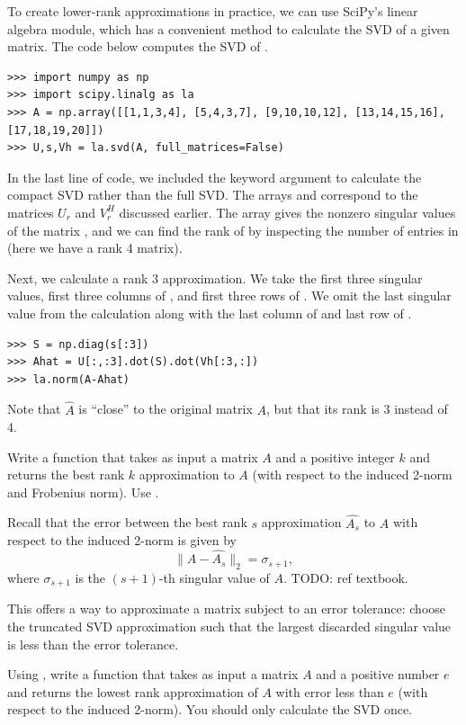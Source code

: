 To create lower-rank approximations in practice, we can use SciPy's linear algebra module, which has a convenient method to calculate the SVD of a given matrix. 
The code below computes the SVD of .
\begin{lstlisting}
>>> import numpy as np
>>> import scipy.linalg as la
>>> A = np.array([[1,1,3,4], [5,4,3,7], [9,10,10,12], [13,14,15,16], [17,18,19,20]])
>>> U,s,Vh = la.svd(A, full_matrices=False)
\end{lstlisting}
In the last line of code, we included the keyword argument  to calculate the
compact SVD rather than the full SVD. The arrays  and  correspond to the matrices
$U_r$ and $V_r^H$ discussed earlier. The array  gives the nonzero singular values
of the matrix , and we can find the rank of  by inspecting the number of entries in  (here we have a rank 4 matrix). 

Next, we calculate a rank 3 approximation.
We take the first three singular values, first three columns of , and first three rows of .
We omit the last singular value from the calculation along with the last column of  and last row of .

\begin{lstlisting}
>>> S = np.diag(s[:3])
>>> Ahat = U[:,:3].dot(S).dot(Vh[:3,:])
>>> la.norm(A-Ahat)
\end{lstlisting}
Note that $\widehat A$ is ``close'' to the original matrix $A$, but that its rank is 3 instead of 4. 

\begin{problem}
Write a function  that takes as input a matrix $A$ and a positive integer $k$ and returns 
the best rank $k$ approximation to $A$ (with respect to the induced 2-norm and Frobenius norm).
Use .
\label{prob:svd_approx}
\end{problem}

Recall that the error between the best rank $s$ approximation $\widehat{A_s}$ to $A$ with respect to the induced 
2-norm is given by
$$
\|A - \widehat{A_s}\|_2 = \sigma_{s+1},
$$
where $\sigma_{s+1}$ is the $(s+1)$-th singular value of $A$. 
TODO: ref textbook.

This offers a way to approximate a matrix subject to an error tolerance: 
choose the truncated SVD approximation such that the largest discarded singular value is less than the error tolerance.

\begin{problem}
Using , write a function  that takes as input a matrix $A$ and a positive number $e$ and returns
the lowest rank approximation of $A$ with error less than $e$ (with respect to the induced 2-norm).
You should only calculate the SVD once.
\end{problem}


